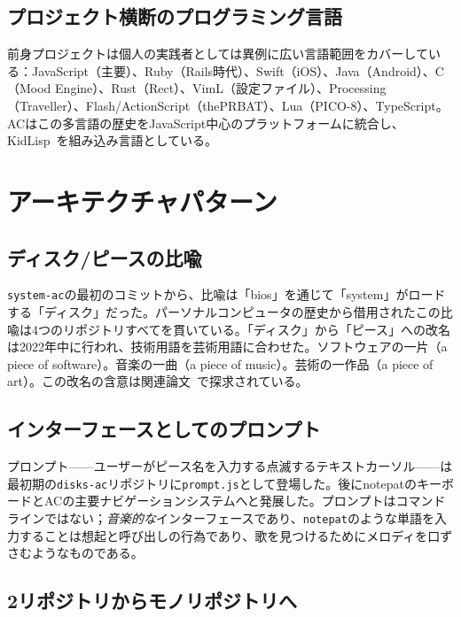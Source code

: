 \documentclass[10pt,letterpaper,twocolumn]{article}
\begin{document}
\subsection{プロジェクト横断のプログラミング言語}

前身プロジェクトは個人の実践者としては異例に広い言語範囲をカバーしている：JavaScript（主要）、Ruby（Rails時代）、Swift（iOS）、Java（Android）、C（Mood Engine）、Rust（Rect）、VimL（設定ファイル）、Processing（Traveller）、Flash/ActionScript（thePRBAT）、Lua（PICO-8）、TypeScript。ACはこの多言語の歴史をJavaScript中心のプラットフォームに統合し、KidLisp~\citep{scudder2026kidlisp}を組み込み言語としている。


\section{アーキテクチャパターン}

\subsection{ディスク/ピースの比喩}

\texttt{system-ac}の最初のコミットから、比喩は「bios」を通じて「system」がロードする「ディスク」だった。パーソナルコンピュータの歴史から借用されたこの比喩は4つのリポジトリすべてを貫いている。「ディスク」から「ピース」への改名は2022年中に行われ、技術用語を芸術用語に合わせた。ソフトウェアの一片（a piece of software）。音楽の一曲（a piece of music）。芸術の一作品（a piece of art）。この改名の含意は関連論文~\citep{scudder2026pieces}で探求されている。

\subsection{インターフェースとしてのプロンプト}

プロンプト——ユーザーがピース名を入力する点滅するテキストカーソル——は最初期の\texttt{disks-ac}リポジトリに\texttt{prompt.js}として登場した。後にnotepatのキーボードとACの主要ナビゲーションシステムへと発展した。プロンプトはコマンドラインではない；\emph{音楽的な}インターフェースであり、\texttt{notepat}のような単語を入力することは想起と呼び出しの行為であり、歌を見つけるためにメロディを口ずさむようなものである。

\subsection{2リポジトリからモノリポジトリへ}
\end{document}
